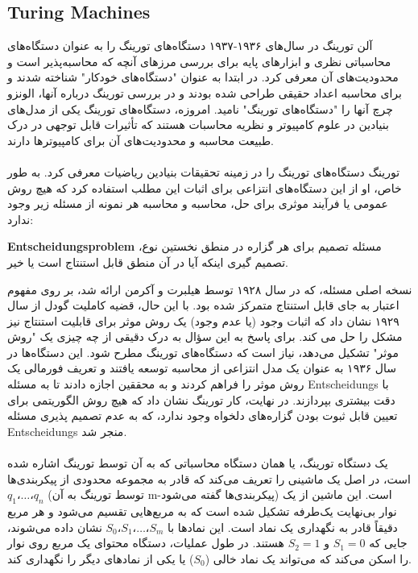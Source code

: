 \documentclass[10pt,a4paper]{article}
\begin{document}
            \subsection{Turing Machines}
آلن تورینگ در سال‌های ۱۹۳۶-۱۹۳۷ دستگاه‌های تورینگ را به عنوان دستگاه‌های محاسباتی نظری و ابزارهای پایه برای بررسی مرزهای آنچه که محاسبه‌پذیر است و محدودیت‌های آن معرفی کرد. در ابتدا به عنوان "دستگاه‌های خودکار" شناخته شدند و برای محاسبه اعداد حقیقی طراحی شده بودند و در بررسی تورینگ درباره آنها، الونزو چرچ آنها را "دستگاه‌های تورینگ" نامید. امروزه، دستگاه‌های تورینگ یکی از مدل‌های بنیادین در علوم کامپیوتر و نظریه محاسبات هستند که تأثیرات قابل توجهی در درک طبیعت محاسبه و محدودیت‌های آن برای کامپیوترها دارند.
                \\
                \\
تورینگ دستگاه‌های تورینگ را در زمینه تحقیقات بنیادین ریاضیات معرفی کرد. به طور خاص، او از این دستگاه‌های انتزاعی برای اثبات این مطلب استفاده کرد که هیچ روش عمومی یا فرآیند موثری برای حل، محاسبه و محاسبه هر نمونه از مسئله زیر وجود ندارد:
                \begin{qt}
                    \textbf{Entscheidungsproblem} مسئله تصمیم برای هر گزاره در منطق نخستین نوع، تصمیم گیری اینکه آیا در آن منطق قابل استنتاج است یا خیر.\cite{sep-spacetime-bebecome}
                \end{qt}
نسخه اصلی مسئله، که در سال ۱۹۲۸ توسط هیلبرت و آکرمن ارائه شد، بر روی مفهوم اعتبار به جای قابل استنتاج متمرکز شده بود. با این حال، قضیه کاملیت گودل از سال ۱۹۲۹ نشان داد که اثبات وجود (یا عدم وجود) یک روش موثر برای قابلیت استنتاج نیز مشکل را حل می کند. برای پاسخ به این سؤال به درک دقیقی از چه چیزی یک "روش موثر" تشکیل می‌دهد، نیاز است که دستگاه‌های تورینگ مطرح شود. این دستگاه‌ها در سال ۱۹۳۶ به عنوان یک مدل انتزاعی از محاسبه توسعه یافتند و تعریف فورمالی یک روش موثر را فراهم کردند و به محققین اجازه دادند تا به مسئله Entscheidungs با دقت بیشتری بپردازند. در نهایت، کار تورینگ نشان داد که هیچ روش الگوریتمی برای تعیین قابل ثبوت بودن گزاره‌های دلخواه وجود ندارد، که به عدم تصمیم پذیری مسئله Entscheidungs منجر شد.
                \\
                \\
یک دستگاه تورینگ، یا همان دستگاه محاسباتی که به آن توسط تورینگ اشاره شده است، در اصل یک ماشینی را تعریف می‌کند که قادر به مجموعه محدودی از پیکربندی‌ها $q_1،\dots،q_n$ (توسط تورینگ به آن m-پیکربندی‌ها گفته می‌شود) است. این ماشین از یک نوار بی‌نهایت یک‌طرفه تشکیل شده است که به مربع‌هایی تقسیم می‌شود و هر مربع دقیقاً قادر به نگهداری یک نماد است. این نمادها با $S_0، S_1، \dots، S_m$ نشان داده می‌شوند، جایی که $S_1 = 0$ و $S_2 = 1$ هستند. در طول عملیات، دستگاه محتوای یک مربع روی نوار را اسکن می‌کند که می‌تواند یک نماد خالی ($S_0$) یا یکی از نمادهای دیگر را نگهداری کند.
\end{document}
